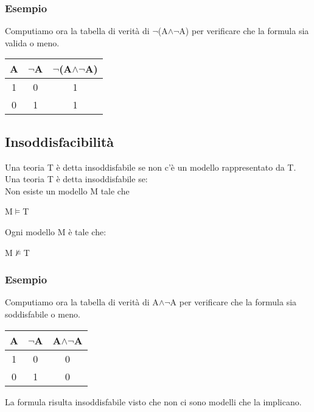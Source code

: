 \documentclass[../main.tex]{subfiles}
\begin{document}
    \subsubsection{Esempio}
    Computiamo ora la tabella di verità di $\lnot$(A$\land \lnot$A) per verificare che la formula sia valida o meno.
    \begin{center}
        \begin{tabular}{|c|c|c|}
            \hline
            A & $\lnot$A & $\lnot$(A$\land \lnot$A)\\
            \hline
            1 & 0 & 1\\
            \hline
            0 & 1 & 1\\
            \hline
        \end{tabular}
    \end{center}

    \subsection{Insoddisfacibilità}
    Una teoria T è detta insoddisfabile se non c'è un modello rappresentato da T.\\
    Una teoria T è detta insoddisfabile se:\\
    Non esiste un modello M tale che
    \begin{center}
        M$\models$T
    \end{center}
    Ogni modello M è tale che:
    \begin{center}
        M$\not \models$T
    \end{center}

    \subsubsection{Esempio}
    Computiamo ora la tabella di verità di A$\land \lnot$A per verificare che la formula sia soddisfabile o meno.
    \begin{center}
        \begin{tabular}{|c|c|c|}
            \hline
            A & $\lnot$A & A$\land \lnot$A\\
            \hline
            1 & 0 & 0\\
            \hline
            0 & 1 & 0\\
            \hline
        \end{tabular}
    \end{center}
    La formula risulta insoddisfabile visto che non ci sono modelli che la implicano.
\end{document}
